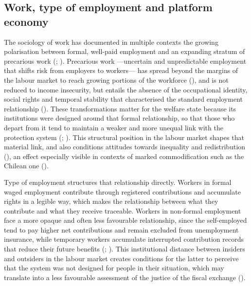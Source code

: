 \documentclass[
  12pt,
]{article}
\begin{document}
\subsection{Work, type of employment and platform
economy}\label{work-type-of-employment-and-platform-economy}

The sociology of work has documented in multiple contexts the growing
polarisation between formal, well-paid employment and an expanding
stratum of precarious work (; ). Precarious
work ---uncertain and unpredictable employment that shifts risk from
employers to workers--- has spread beyond the margins of the labour
market to reach growing portions of the workforce
(), and is not
reduced to income insecurity, but entails the absence of the
occupational identity, social rights and temporal stability that
characterised the standard employment relationship
(). These
transformations matter for the welfare state because its institutions
were designed around that formal relationship, so that those who depart
from it tend to maintain a weaker and more unequal link with the
protection system (; ). This structural position in the labour market shapes that
material link, and also conditions attitudes towards inequality and
redistribution (), an effect especially visible in contexts of marked
commodification such as the Chilean one
().

Type of employment structures that relationship directly. Workers in
formal waged employment contribute through registered contributions and
accumulate rights in a legible way, which makes the relationship between
what they contribute and what they receive traceable. Workers in
non-formal employment face a more opaque and often less favourable
relationship, since the self-employed tend to pay higher net
contributions and remain excluded from unemployment insurance, while
temporary workers accumulate interrupted contribution records that
reduce their future benefits (; ). This
institutional distance between insiders and outsiders in the labour
market creates conditions for the latter to perceive that the system was
not designed for people in their situation, which may translate into a
less favourable assessment of the justice of the fiscal exchange
().
\end{document}
